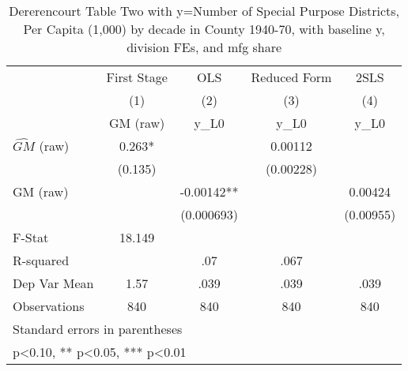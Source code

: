 \begin{table}[htbp]\centering
\def\sym#1{\ifmmode^{#1}\else\(^{#1}\)\fi}
\caption{Dererencourt Table Two with y=Number of Special Purpose Districts, Per Capita (1,000) by decade in County 1940-70, with baseline y, division FEs, and mfg share}
\begin{tabular}{l*{4}{c}}
\toprule
                    & First Stage   &         OLS   &Reduced Form   &        2SLS   \\
                    &\multicolumn{1}{c}{(1)}&\multicolumn{1}{c}{(2)}&\multicolumn{1}{c}{(3)}&\multicolumn{1}{c}{(4)}\\
                    &\multicolumn{1}{c}{GM  (raw)}&\multicolumn{1}{c}{y\_L0}&\multicolumn{1}{c}{y\_L0}&\multicolumn{1}{c}{y\_L0}\\
\midrule
$\hat{GM}$ (raw)    &       0.263*  &               &     0.00112   &               \\
                    &     (0.135)   &               &   (0.00228)   &               \\
\addlinespace
GM  (raw)           &               &    -0.00142** &               &     0.00424   \\
                    &               &  (0.000693)   &               &   (0.00955)   \\
\midrule
F-Stat              &      18.149   &               &               &               \\
R-squared           &               &         .07   &        .067   &               \\
Dep Var Mean        &        1.57   &        .039   &        .039   &        .039   \\
Observations        &         840   &         840   &         840   &         840   \\
\bottomrule
\multicolumn{5}{l}{\footnotesize Standard errors in parentheses}\\
\multicolumn{5}{l}{\footnotesize * p<0.10, ** p<0.05, *** p<0.01}\\
\end{tabular}
\end{table}
